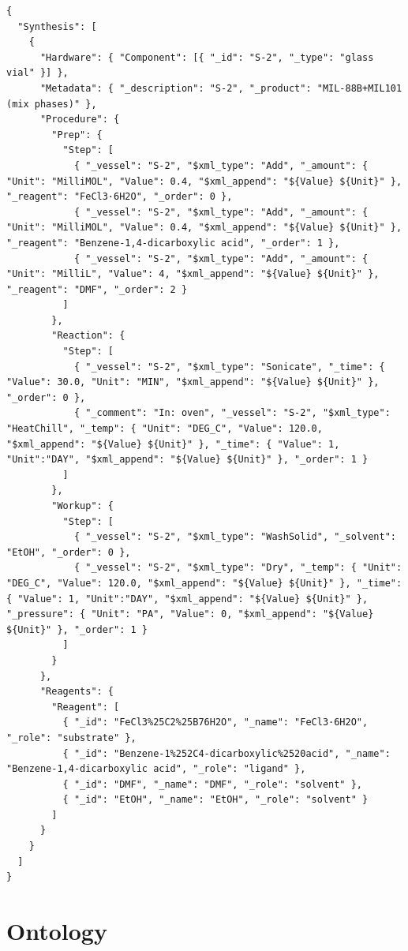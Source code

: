 \begin{lstlisting}[float=htbp,style=json,caption={Representative JSON excerpt from the MOF synthesis dataset for \texttt{S-2}},label={lst:application_mof_json_example_s_2}]
{
  "Synthesis": [
    {
      "Hardware": { "Component": [{ "_id": "S-2", "_type": "glass vial" }] },
      "Metadata": { "_description": "S-2", "_product": "MIL-88B+MIL101 (mix phases)" },
      "Procedure": {
        "Prep": {
          "Step": [
            { "_vessel": "S-2", "$xml_type": "Add", "_amount": { "Unit": "MilliMOL", "Value": 0.4, "$xml_append": "${Value} ${Unit}" }, "_reagent": "FeCl3·6H2O", "_order": 0 },
            { "_vessel": "S-2", "$xml_type": "Add", "_amount": { "Unit": "MilliMOL", "Value": 0.4, "$xml_append": "${Value} ${Unit}" }, "_reagent": "Benzene-1,4-dicarboxylic acid", "_order": 1 },
            { "_vessel": "S-2", "$xml_type": "Add", "_amount": { "Unit": "MilliL", "Value": 4, "$xml_append": "${Value} ${Unit}" }, "_reagent": "DMF", "_order": 2 }
          ]
        },
        "Reaction": {
          "Step": [
            { "_vessel": "S-2", "$xml_type": "Sonicate", "_time": { "Value": 30.0, "Unit": "MIN", "$xml_append": "${Value} ${Unit}" }, "_order": 0 },
            { "_comment": "In: oven", "_vessel": "S-2", "$xml_type": "HeatChill", "_temp": { "Unit": "DEG_C", "Value": 120.0, "$xml_append": "${Value} ${Unit}" }, "_time": { "Value": 1, "Unit":"DAY", "$xml_append": "${Value} ${Unit}" }, "_order": 1 }
          ]
        },
        "Workup": {
          "Step": [
            { "_vessel": "S-2", "$xml_type": "WashSolid", "_solvent": "EtOH", "_order": 0 },
            { "_vessel": "S-2", "$xml_type": "Dry", "_temp": { "Unit": "DEG_C", "Value": 120.0, "$xml_append": "${Value} ${Unit}" }, "_time": { "Value": 1, "Unit":"DAY", "$xml_append": "${Value} ${Unit}" }, "_pressure": { "Unit": "PA", "Value": 0, "$xml_append": "${Value} ${Unit}" }, "_order": 1 }
          ]
        }
      },
      "Reagents": {
        "Reagent": [
          { "_id": "FeCl3%25C2%25B76H2O", "_name": "FeCl3·6H2O", "_role": "substrate" },
          { "_id": "Benzene-1%252C4-dicarboxylic%2520acid", "_name": "Benzene-1,4-dicarboxylic acid", "_role": "ligand" },
          { "_id": "DMF", "_name": "DMF", "_role": "solvent" },
          { "_id": "EtOH", "_name": "EtOH", "_role": "solvent" }
        ]
      }
    }
  ]
}
\end{lstlisting}

\section{ Ontology}\label{sec:application:metal:chmo-introduction}

